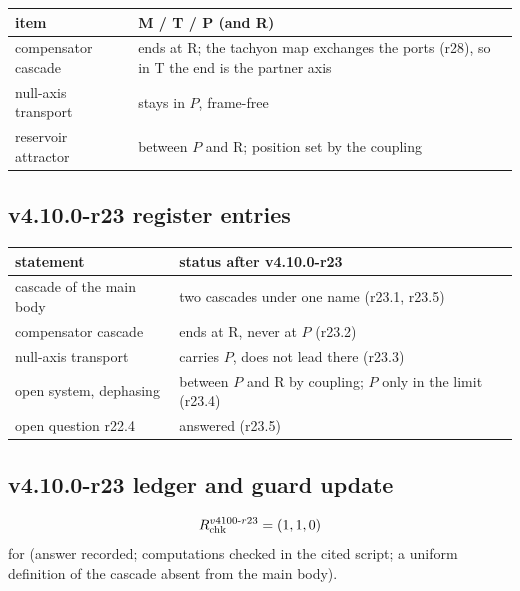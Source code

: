 \begin{center}
\small
\begin{tabular}{@{}>{\raggedright\arraybackslash}p{}>{\raggedright\arraybackslash}p{}@{}}
\toprule
item & M / T / P (and R)\\
\midrule
compensator cascade & ends at R; the tachyon map exchanges the ports (r28), so in T the end is the partner axis\\
null-axis transport & stays in \(P\), frame-free\\
reservoir attractor & between \(P\) and R; position set by the coupling\\
\bottomrule
\end{tabular}
\end{center}

\subsection*{v4.10.0-r23 register entries}
\label{subsec:v4100-r23-register}

\begin{center}
\small
\begin{tabular}{@{}>{\raggedright\arraybackslash}p{}>{\raggedright\arraybackslash}p{}@{}}
\toprule
statement & status after v4.10.0-r23\\
\midrule
cascade of the main body & two cascades under one name (r23.1, r23.5)\\
compensator cascade & ends at R, never at \(P\) (r23.2)\\
null-axis transport & carries \(P\), does not lead there (r23.3)\\
open system, dephasing & between \(P\) and R by coupling; \(P\) only in the limit (r23.4)\\
open question r22.4 & answered (r23.5)\\
\bottomrule
\end{tabular}
\end{center}

\subsection*{v4.10.0-r23 ledger and guard update}
\label{subsec:v4100-r23-ledger-guard}

\[
R_{\rm chk}^{v4100\text{-}r23}=(1,1,0)
\]
for (answer recorded; computations checked in the cited script; a uniform definition of the cascade absent from the main body).

